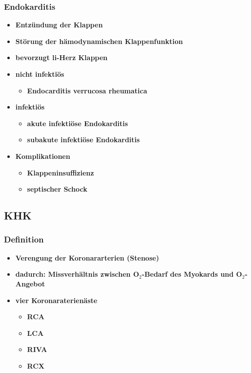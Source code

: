 		\subsubsection{Endokarditis}
			\begin{itemize}
				\item \textbf{Entzündung der Klappen}
				\item \textbf{Störung der hämodynamischen Klappenfunktion}
				\item \textbf{bevorzugt li-Herz Klappen}
				\item \textbf{nicht infektiös}
					\begin{itemize}
						\item \textbf{Endocarditis verrucosa rheumatica}
					\end{itemize}
				\item \textbf{infektiös}
					\begin{itemize}
						\item \textbf{akute infektiöse Endokarditis}
						\item \textbf{subakute infektiöse Endokarditis}
					\end{itemize}
				\item \textbf{Komplikationen}
					\begin{itemize}
						\item \textbf{Klappeninsuffizienz}
						\item \textbf{septischer Schock}
					\end{itemize}
			\end{itemize}
	\subsection{KHK}
		\subsubsection{Definition}
			\begin{itemize}
				\item \textbf{Verengung der Koronararterien (Stenose)}
				\item \textbf{dadurch: Missverhältnis zwischen O$_2$-Bedarf des Myokards und O$_2$-Angebot}
				\item \textbf{vier Koronaraterienäste}
					\begin{itemize}
						\item \textbf{RCA}
						\item \textbf{LCA}
						\item \textbf{RIVA}
						\item \textbf{RCX}
					\end{itemize}
			\end{itemize}
